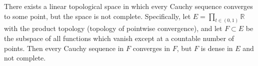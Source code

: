 There exists a linear topological space in which every Cauchy sequence converges to some point, but the space is not complete. Specifically, let $E = \prod_{t \in (0,1)} \mathbb{R}$ with the product topology (topology of pointwise convergence), and let $F \subset E$ be the subspace of all functions which vanish except at a countable number of points. Then every Cauchy sequence in $F$ converges in $F$, but $F$ is dense in $E$ and not complete.
